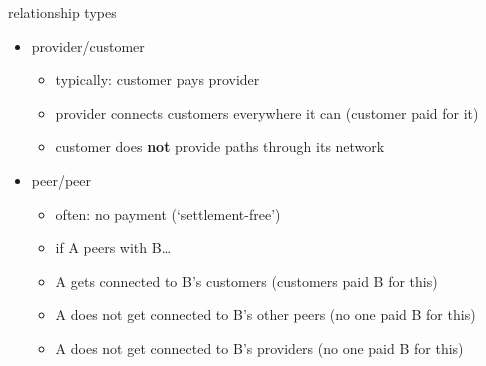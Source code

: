 \begin{frame}{relationship types}
    \begin{itemize}
    \item provider/customer
        \begin{itemize}
        \item typically: customer pays provider
        \item provider connects customers everywhere it can (customer paid for it)
        \item customer does \textbf{not} provide paths through its network
        \end{itemize}
    \item peer/peer
        \begin{itemize}
        \item often: no payment (`settlement-free')
        \item if A peers with B\ldots
        \item A gets connected to B's customers (customers paid B for this)
        \item A does not get connected to B's other peers (no one paid B for this)
        \item A does not get connected to B's providers (no one paid B for this)
        \end{itemize}
    \end{itemize}
\end{frame}
